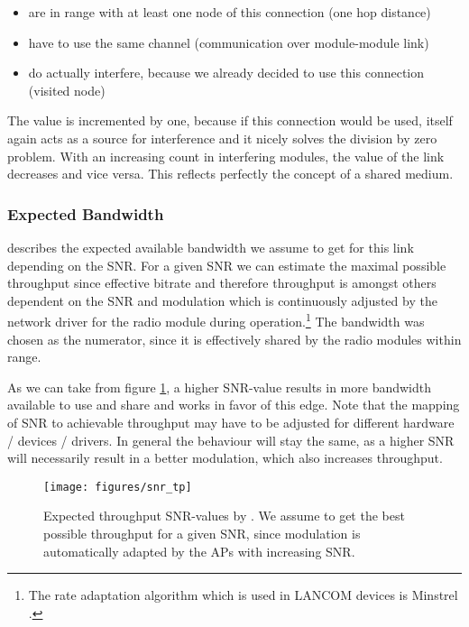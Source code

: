 	\begin{itemize}
	\item are in range with at least one node of this connection (one hop distance)
	
	\item have to use the same channel (communication over module-module link)
	
	\item do actually interfere, because we already decided to use this connection (visited node)
	\end{itemize}

	The value is incremented by one, because if this connection would be used, itself again acts as a source for interference and it nicely solves the division by zero
	problem. With an increasing count in interfering modules, the value of the link decreases and vice versa. This reflects perfectly the concept of a shared medium.

      \subsubsection{Expected Bandwidth}
	describes the expected available bandwidth we assume to get for this link depending on the \ac{SNR}.
	For a given \ac{SNR} we can estimate the maximal possible throughput since effective bitrate and therefore throughput is amongst others dependent on the \ac{SNR}
	and modulation which is continuously adjusted by the network driver for the radio module during operation.\footnote{The rate adaptation algorithm 
	which is used in LANCOM devices is Minstrel \cite{minstrel}.} 
	The bandwidth was chosen as the numerator, since it is effectively shared by the radio modules within range.
	
	As we can take from figure \ref{fig:snr_tp}, a higher \ac{SNR}-value results in more bandwidth available to use and share and works in favor of this edge.
	Note that the mapping of \ac{SNR} to achievable throughput may have to be adjusted for different hardware / devices / drivers. 
	In general the behaviour will stay the same, as a higher \ac{SNR} will necessarily result in a better modulation, which also increases throughput.
	
	\begin{figure}[h!]
	  \centering
	  \texttt{[image: figures/snr\_tp]}
	  \caption{Expected throughput \ac{SNR}-values by \cite{expected_snr}. We assume to get the best possible throughput for a given \ac{SNR}, since 
	    modulation is automatically adapted by the APs with increasing \ac{SNR}.}
	  \label{fig:snr_tp}
	\end{figure}
	
